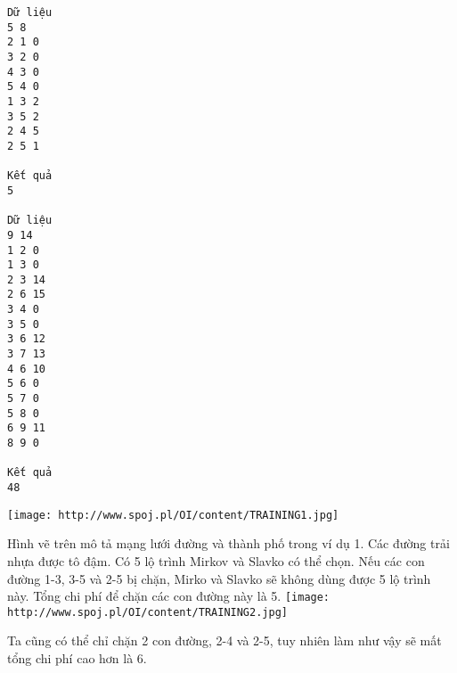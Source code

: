 \begin{verbatim}
Dữ liệu
5 8
2 1 0
3 2 0
4 3 0
5 4 0
1 3 2
3 5 2
2 4 5
2 5 1

Kết quả
5

Dữ liệu
9 14
1 2 0
1 3 0
2 3 14
2 6 15
3 4 0
3 5 0
3 6 12
3 7 13
4 6 10
5 6 0
5 7 0
5 8 0
6 9 11
8 9 0

Kết quả
48
\end{verbatim}
\texttt{[image: http://www.spoj.pl/OI/content/TRAINING1.jpg]}

   Hình vẽ trên mô tả mạng lưới đường và thành phố trong ví dụ 1. Các đường trải nhựa được tô đậm. Có 5 lộ trình Mirkov và Slavko có thể chọn. Nếu các con đường 1-3, 3-5 và 2-5 bị chặn, Mirko và Slavko sẽ không dùng được 5 lộ trình này. Tổng chi phí để chặn các con đường này là 5.  
\texttt{[image: http://www.spoj.pl/OI/content/TRAINING2.jpg]}

   Ta cũng có thể chỉ chặn 2 con đường, 2-4 và 2-5, tuy nhiên làm như vậy sẽ mất tổng chi phí cao hơn là 6.